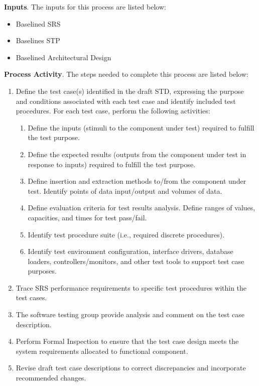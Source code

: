 \documentclass[a4paper, 11pt]{article}
\begin{document}
\textbf{Inputs}. The inputs for this process are listed below:
\begin{itemize}
	\item Baselined SRS
	\item Baselines STP
	\item Baselined Architectural Design
\end{itemize}

\textbf{Process Activity}. The steps needed to complete this process are listed below:
\begin{enumerate}
	\item Define the test case(s) identified in the draft STD, expressing the purpose and conditions associated with each test case and identify included test procedures. For each test case, perform the following activities:
	\begin{enumerate}
		\item Define the inputs (stimuli to the component under test) required to fulfill the test purpose.
		\item Define the expected results (outputs from the component under test in response to inputs) required to fulfill the test purpose.
		\item Define insertion and extraction methods to/from the component under test. Identify points of data input/output and volumes of data.
		\item Define evaluation criteria for test results analysis. Define ranges of values, capacities, and times for test pass/fail.
		\item Identify test procedure suite (i.e., required discrete procedures).
		\item Identify test environment configuration, interface drivers, database loaders, controllers/monitors, and other test tools to support test case purposes.
	\end{enumerate}
	\item Trace SRS performance requirements to specific test procedures within the test cases.
	\item The software testing group provide analysis and comment on the test case description.
	\item Perform Formal Inspection to ensure that the test case design meets the system requirements allocated to functional component.
	\item Revise draft test case descriptions to correct discrepancies and incorporate recommended	changes.
\end{enumerate}
\end{document}
